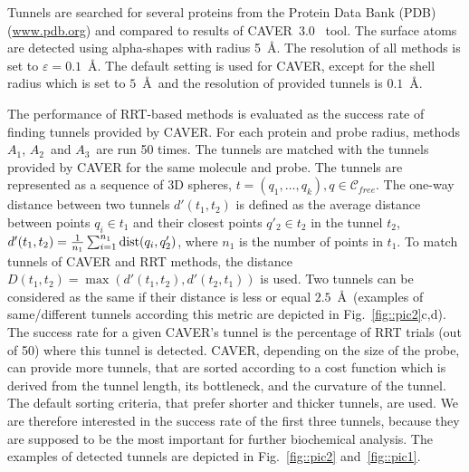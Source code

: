 \documentclass{llncs}
\def\CF{\mathcal{C}_{free}}
\def\dist{\mathrm{dist}}
\def\TA{$A_1$}
\def\TB{$A_2$}
\def\TC{$A_3$}
\def\Sprobe{S_{\mathrm{probe}}}
\def\gprobe{r_{\mathrm{out}}}
\begin{document}
Tunnels are searched for several proteins from the Protein Data Bank (PDB) (\url{www.pdb.org}) and compared
to results of CAVER~3.0~\cite{caver3} tool.
The surface atoms are detected using alpha-shapes with radius 5~\AA. 
The resolution of all methods is set to $\varepsilon=0.1$~\AA.
The default setting is used for CAVER, except for the shell radius which is set to $5$~\AA~and the resolution of provided tunnels is $0.1$~\AA.

The performance of RRT-based methods is evaluated as the success rate of finding tunnels provided by CAVER.
For each protein and probe radius, methods \TA, \TB\ and \TC\ are run 50 times.
The tunnels are matched with the tunnels provided by CAVER for the same molecule and probe.
The tunnels are represented as a sequence of 3D spheres, $t=(q_1,\ldots,q_k), q\in\CF$.
The one-way distance between two tunnels $d'(t_1,t_2)$ is defined as the average distance between points $q_i \in t_1$ and 
their closest points $q'_2 \in t_2$ in the tunnel $t_2$, $d'(t_1,t_2)={1\over n_1}\sum_{i=1}^{n_1} \dist(q_i, q_2')$, where $n_1$ is the
number of points in $t_1$.
To match tunnels of CAVER and RRT methods, the distance
$D(t_1,t_2) = \max( d'(t_1, t_2), d'(t_2, t_1))$ is used.
Two tunnels can be considered as the same if their distance is less or equal 
$2.5$~\AA~(examples of same/different tunnels according this metric are depicted in Fig.~\ref{fig::pic2}c,d).
The success rate for a given CAVER's tunnel is the percentage of RRT trials (out of 50) where this tunnel is detected.
CAVER, depending on the size of the probe, can provide more tunnels, that are sorted according 
to a cost function which is derived from the tunnel length, its bottleneck, and the curvature of the tunnel.
The default sorting criteria, that prefer shorter and thicker tunnels, are used.
We are therefore interested in the success rate of the first three tunnels, because they are 
supposed to be the most important for further biochemical analysis.
The examples of detected tunnels are depicted in Fig.~\ref{fig::pic2} and~\ref{fig::pic1}.


\end{document}
